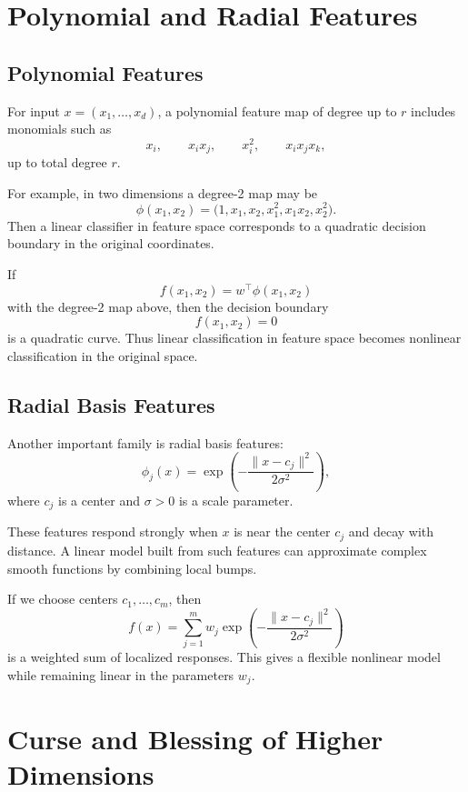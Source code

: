\section{Polynomial and Radial Features}

\subsection{Polynomial Features}

For input $x=(x_1,\dots,x_d)$, a polynomial feature map of degree up to $r$ includes monomials such as
\[
x_i,\qquad x_i x_j,\qquad x_i^2,\qquad x_i x_j x_k,
\]
up to total degree $r$.

For example, in two dimensions a degree-2 map may be
\[
\phi(x_1,x_2)=
\big(1,x_1,x_2,x_1^2,x_1x_2,x_2^2\big).
\]
Then a linear classifier in feature space corresponds to a quadratic decision boundary in the original coordinates.

\begin{example}
If
\[
f(x_1,x_2)=w^\top \phi(x_1,x_2)
\]
with the degree-2 map above, then the decision boundary
\[
f(x_1,x_2)=0
\]
is a quadratic curve. Thus linear classification in feature space becomes nonlinear classification in the original space.
\end{example}

\subsection{Radial Basis Features}

Another important family is radial basis features:
\[
\phi_j(x)=\exp\!\left(-\frac{\|x-c_j\|^2}{2\sigma^2}\right),
\]
where $c_j$ is a center and $\sigma>0$ is a scale parameter.

These features respond strongly when $x$ is near the center $c_j$ and decay with distance. A linear model built from such features can approximate complex smooth functions by combining local bumps.

\begin{example}
If we choose centers $c_1,\dots,c_m$, then
\[
f(x)=\sum_{j=1}^m w_j \exp\!\left(-\frac{\|x-c_j\|^2}{2\sigma^2}\right)
\]
is a weighted sum of localized responses. This gives a flexible nonlinear model while remaining linear in the parameters $w_j$.
\end{example}

\section{Curse and Blessing of Higher Dimensions}

